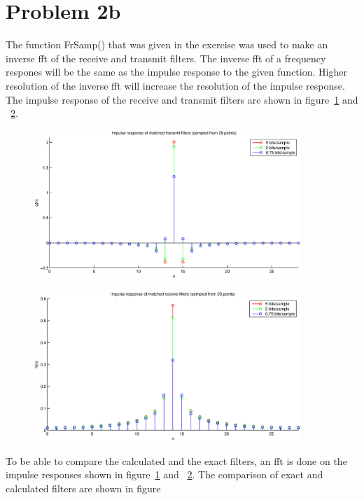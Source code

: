 \section{Problem 2b}
	The function FrSamp() that was given in the exercise was used to make an inverse fft of the receive and transmit filters. The inverse fft of a frequency respones will be the same as the impulse response to the given function. Higher resolution of the inverse fft will increase the resolution of the impulse response. The impulse response of the receive and transmit filters are shown in figure~\ref{fig:impulse_G_diskrete} and ~\ref{fig:impulse_H_diskrete}.
	
	\begin{figure}[H]
	  \centering
	  \includegraphics[width=0.9\textwidth]{img/Oppgave2b_impulse_G_diskrete_t}
	  \label{fig:impulse_G_diskrete}
	\end{figure}
	
	\begin{figure}[H]
	  \centering
	  \includegraphics[width=0.9\textwidth]{img/Oppgave2b_impulse_H_diskrete_t}
	  \label{fig:impulse_H_diskrete}
	\end{figure}
	
	To be able to compare the calculated and the exact filters, an fft is done on the impulse responses shown in figure~\ref{fig:impulse_G_diskrete} and ~\ref{fig:impulse_H_diskrete}. The comparison of exact and calculated filters are shown in figure
	
